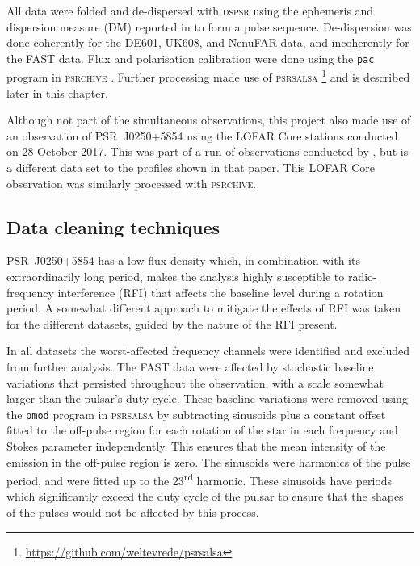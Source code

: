 All data were folded and de-dispersed with \textsc{dspsr} \citep{SBxx2011} using the ephemeris and dispersion measure (DM) reported in \citet{TBC+2018} to form a pulse sequence. De-dispersion was done coherently for the DE601, UK608, and NenuFAR data, and incoherently for the FAST data. Flux and polarisation calibration were done using the \texttt{pac} program in \textsc{psrchive} \citep{SMJR2010}. Further processing made use of \textsc{psrsalsa} \citep{Wxxx2016}\footnote{\url{https://github.com/weltevrede/psrsalsa}} and is described later in this chapter.

Although not part of the simultaneous observations, this project also made use of an observation of PSR~J0250+5854 using the LOFAR Core stations \citep{HWG+2013} conducted on 28 October 2017. This was part of a run of observations conducted by \citet{TBC+2018}, but is a different data set to the profiles shown in that paper. This LOFAR Core observation was similarly processed with \textsc{psrchive}.













\subsection{Data cleaning techniques}
\label{sec: J0250 - observations - cleaning}

PSR~J0250+5854 has a low flux-density which, in combination with its extraordinarily long period, makes the analysis highly susceptible to radio-frequency interference (RFI) that affects the baseline level during a rotation period. A somewhat different approach to mitigate the effects of RFI was taken for the different datasets, guided by the nature of the RFI present.

In all datasets the worst-affected frequency channels were identified and excluded from further analysis. The FAST data were affected by stochastic baseline variations that persisted throughout the observation, with a scale somewhat larger than the pulsar's duty cycle. These baseline variations were removed using the \texttt{pmod} program in \textsc{psrsalsa} by subtracting sinusoids plus a constant offset fitted to the off-pulse region for each rotation of the star in each frequency and Stokes parameter independently. This ensures that the mean intensity of the emission in the off-pulse region is zero. The sinusoids were harmonics of the pulse period, and were fitted up to the 23\textsuperscript{rd} harmonic. These sinusoids have periods which significantly exceed the duty cycle of the pulsar to ensure that the shapes of the pulses would not be affected by this process.

